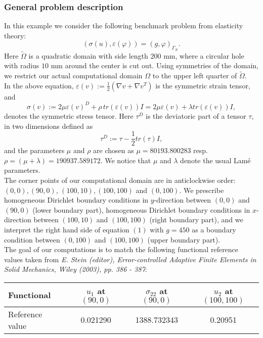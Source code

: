\subsubsection{General problem description}

In this example we consider the following benchmark problem from elasticity theory:  
\begin{equation}
   (\sigma(u),\varepsilon(\varphi)) = (g,\varphi)_{\Gamma_N}.
\end{equation}
Here $\tilde{\Omega}$ is a quadratic domain with side length $200$ mm, where a circular hole with radius $10$ mm around the center is cut out. Using symmetries of the domain, we restrict our actual computational domain $\Omega$ to the upper left quarter of $\tilde{\Omega}$.\\
In the above equation, $\varepsilon(v) := \frac{1}{2}(\nabla v + \nabla v^T)$ is the symmetric strain tensor, and 
\begin{equation*}
   \sigma(v) := 2\mu \varepsilon(v)^D + \rho \, tr (\varepsilon(v)) I = 2\mu\varepsilon(v) + \lambda tr(\varepsilon(v)) I,
\end{equation*}
denotes the symmetric stress tensor. Here $\tau^D$ is the deviatoric part of a tensor $\tau$, in two dimensions defined as 
\begin{equation*}
   \tau^D := \tau - \frac{1}{2} tr(\tau) I,
\end{equation*}
and the parameters $\mu$ and $\rho$ are chosen as $\mu = 80193.800283$
resp. $\rho = (\mu + \lambda) = 190937.589172$. We notice that $\mu$ and
$\lambda$ denote the usual Lam\'e parameters.\\
The corner points of our computational domain are in anticlockwise order: $(0,0), (90,0)$, $(100,10), (100,100)$ and $(0,100)$. We prescribe homogeneous Dirichlet boundary conditions in $y$-direction between $(0,0)$ and $(90,0)$ (lower boundary part), homogeneous Dirichlet boundary conditions in $x$-direction between $(100,10)$ and $(100,100)$ (right boundary part), and we interpret the right hand side of equation $(1)$ with $g = 450$ as a boundary condition between $(0,100)$ and $(100,100)$ (upper boundary part).\\
The goal of our computations is to match the following functional reference values taken from \textit{E. Stein (editor), Error-controlled Adaptive Finite Elements in Solid Mechanics, Wiley (2003), pp. 386 - 387}:
\begin{table}[h]
\centering
\begin{tabular}{lccc}    
\hline
 Functional & $u_1$ at $(90,0)$ & $\sigma_{22}$ at $(90,0)$ & $u_2$ at $(100,100)$\\
\hline 
 Reference value & 0.021290 & 1388.732343 & 0.20951\\
\hline
\end{tabular}
\end{table}
